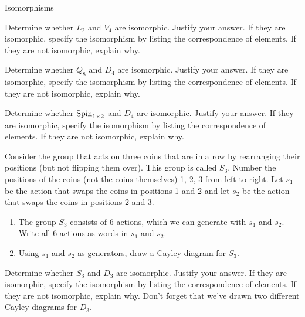 \begin{section}{Isomorphisms}
\begin{problem}
Determine whether $L_2$ and $V_4$ are isomorphic.  Justify your answer.  If they are isomorphic, specify the isomorphism by listing the correspondence of elements. If they are not isomorphic, explain why.
\end{problem}

\begin{problem}
Determine whether $Q_8$ and $D_4$ are isomorphic.  Justify your answer.  If they are isomorphic, specify the isomorphism by listing the correspondence of elements. If they are not isomorphic, explain why.
\end{problem}

\begin{problem}
Determine whether $\operatorname{Spin}_{1\times 2}$ and $D_4$ are isomorphic.  Justify your answer.  If they are isomorphic, specify the isomorphism by listing the correspondence of elements. If they are not isomorphic, explain why.
\end{problem}

\begin{exercise}\label{exer:S3}
Consider the group that acts on three coins that are in a row by rearranging their positions (but not flipping them over).  This group is called $S_3$.  Number the positions of the coins (not the coins themselves) 1, 2, 3 from left to right.  Let $s_1$ be the action that swaps the coins in positions 1 and 2 and let $s_2$ be the action that swaps the coins in positions 2 and 3.
\begin{enumerate}[label=\rm{(\alph*)}]
\item The group $S_3$ consists of 6 actions, which we can generate with $s_1$ and $s_2$.  Write all 6 actions as words in $s_1$ and $s_2$.
\item Using $s_1$ and $s_2$ as generators, draw a Cayley diagram for $S_3$.
\end{enumerate}
\end{exercise}

\begin{problem}\label{prob:D3_iso_S3}
Determine whether $S_3$ and $D_3$ are isomorphic.  Justify your answer.  If they are isomorphic, specify the isomorphism by listing the correspondence of elements.  If they are not isomorphic, explain why. Don't forget that we've drawn two different Cayley diagrams for $D_3$.
\end{problem}

\end{section}